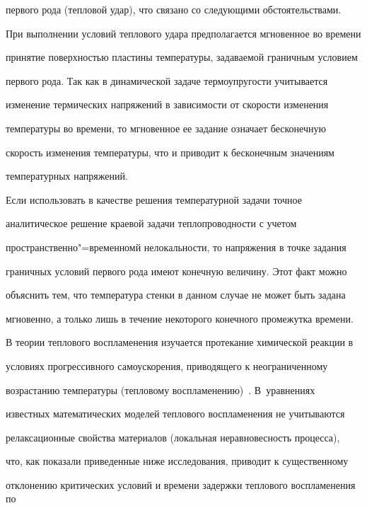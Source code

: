 первого рода (тепловой удар), что связано со следующими обстоятельствами.

При выполнении условий теплового удара предполагается мгновенное во времени

принятие поверхностью пластины температуры, задаваемой граничным условием

первого рода. Так как в динамической задаче термоупругости учитывается

изменение термических напряжений в зависимости от скорости изменения

температуры во времени, то мгновенное ее задание означает бесконечную

скорость изменения температуры, что и приводит к бесконечным значениям

температурных напряжений.



Если использовать в качестве решения температурной задачи точное

аналитическое решение краевой задачи теплопроводности с учетом

пространственно"=временномй нелокальности, то напряжения в точке задания

граничных условий первого рода имеют конечную величину. Этот факт можно

объяснить тем, что температура стенки в данном случае не может быть задана

мгновенно, а только лишь в течение некоторого конечного промежутка времени.



\smallskip 




В теории теплового воспламенения изучается протекание химической реакции в

условиях прогрессивного самоускорения, приводящего к неограниченному

возрастанию температуры (тепловому воспламенению)~\cite{kud:bib22,kud:bib23}. В~уравнениях

известных математических моделей теплового воспламенения не учитываются

релаксационные свойства материалов (локальная неравновесность процесса),

что, как показали приведенные ниже исследования, приводит к существенному

отклонению критических условий и времени задержки теплового воспламенения по

